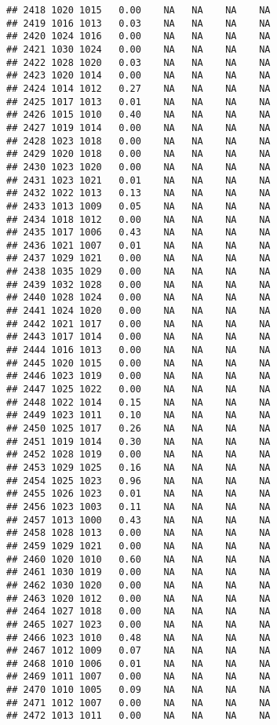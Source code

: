 \documentclass{article}\usepackage{graphicx, color}
\makeatletter
\newenvironment{kframe}{%
 \def\at@end@of@kframe{}%
 \ifinner\ifhmode%
  \def\at@end@of@kframe{\end{minipage}}%
  \begin{minipage}{\columnwidth}%
 \fi\fi%
 \def\FrameCommand##1{\hskip\@totalleftmargin \hskip-\fboxsep
 \colorbox{shadecolor}{##1}\hskip-\fboxsep
     \hskip-\linewidth \hskip-\@totalleftmargin \hskip\columnwidth}%
 \MakeFramed {\advance\hsize-\width
   \@totalleftmargin\z@ \linewidth\hsize
   \@setminipage}}%
 {\par\unskip\endMakeFramed%
 \at@end@of@kframe}
\newenvironment{knitrout}{}{} %
\makeatother
\begin{document}
\begin{knitrout}
\begin{kframe}
\begin{verbatim}
## 2418 1020 1015   0.00    NA   NA    NA    NA
## 2419 1016 1013   0.03    NA   NA    NA    NA
## 2420 1024 1016   0.00    NA   NA    NA    NA
## 2421 1030 1024   0.00    NA   NA    NA    NA
## 2422 1028 1020   0.03    NA   NA    NA    NA
## 2423 1020 1014   0.00    NA   NA    NA    NA
## 2424 1014 1012   0.27    NA   NA    NA    NA
## 2425 1017 1013   0.01    NA   NA    NA    NA
## 2426 1015 1010   0.40    NA   NA    NA    NA
## 2427 1019 1014   0.00    NA   NA    NA    NA
## 2428 1023 1018   0.00    NA   NA    NA    NA
## 2429 1020 1018   0.00    NA   NA    NA    NA
## 2430 1023 1020   0.00    NA   NA    NA    NA
## 2431 1023 1021   0.01    NA   NA    NA    NA
## 2432 1022 1013   0.13    NA   NA    NA    NA
## 2433 1013 1009   0.05    NA   NA    NA    NA
## 2434 1018 1012   0.00    NA   NA    NA    NA
## 2435 1017 1006   0.43    NA   NA    NA    NA
## 2436 1021 1007   0.01    NA   NA    NA    NA
## 2437 1029 1021   0.00    NA   NA    NA    NA
## 2438 1035 1029   0.00    NA   NA    NA    NA
## 2439 1032 1028   0.00    NA   NA    NA    NA
## 2440 1028 1024   0.00    NA   NA    NA    NA
## 2441 1024 1020   0.00    NA   NA    NA    NA
## 2442 1021 1017   0.00    NA   NA    NA    NA
## 2443 1017 1014   0.00    NA   NA    NA    NA
## 2444 1016 1013   0.00    NA   NA    NA    NA
## 2445 1020 1015   0.00    NA   NA    NA    NA
## 2446 1023 1019   0.00    NA   NA    NA    NA
## 2447 1025 1022   0.00    NA   NA    NA    NA
## 2448 1022 1014   0.15    NA   NA    NA    NA
## 2449 1023 1011   0.10    NA   NA    NA    NA
## 2450 1025 1017   0.26    NA   NA    NA    NA
## 2451 1019 1014   0.30    NA   NA    NA    NA
## 2452 1028 1019   0.00    NA   NA    NA    NA
## 2453 1029 1025   0.16    NA   NA    NA    NA
## 2454 1025 1023   0.96    NA   NA    NA    NA
## 2455 1026 1023   0.01    NA   NA    NA    NA
## 2456 1023 1003   0.11    NA   NA    NA    NA
## 2457 1013 1000   0.43    NA   NA    NA    NA
## 2458 1028 1013   0.00    NA   NA    NA    NA
## 2459 1029 1021   0.00    NA   NA    NA    NA
## 2460 1020 1010   0.60    NA   NA    NA    NA
## 2461 1030 1019   0.00    NA   NA    NA    NA
## 2462 1030 1020   0.00    NA   NA    NA    NA
## 2463 1020 1012   0.00    NA   NA    NA    NA
## 2464 1027 1018   0.00    NA   NA    NA    NA
## 2465 1027 1023   0.00    NA   NA    NA    NA
## 2466 1023 1010   0.48    NA   NA    NA    NA
## 2467 1012 1009   0.07    NA   NA    NA    NA
## 2468 1010 1006   0.01    NA   NA    NA    NA
## 2469 1011 1007   0.00    NA   NA    NA    NA
## 2470 1010 1005   0.09    NA   NA    NA    NA
## 2471 1012 1007   0.00    NA   NA    NA    NA
## 2472 1013 1011   0.00    NA   NA    NA    NA

\end{verbatim}
\end{kframe}
\end{knitrout}
\end{document}
